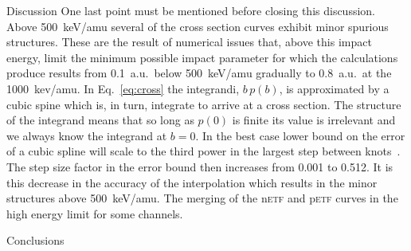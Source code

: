 \documentclass[aps, pra, reprint, groupedaddress, amsfonts,
               amsmath, amssymb, showpacs, nofootinbib]{revtex4-1}
\begin{document}
\begin{section}{Discussion \label{sec:disc}}
   One last point must be mentioned before closing this discussion. Above 500~keV/amu several of the cross
   section curves exhibit minor spurious structures. These are the result of numerical issues that, above
   this impact energy, limit the minimum possible impact parameter for which the calculations produce
   results from 0.1~a.u.\ below 500~keV/amu gradually to 0.8~a.u.\ at the 1000~kev/amu. In
   Eq.~\eqref{eq:cross} the integrandi, $b \, p(b)$, is approximated by a cubic spine which is, in turn,
   integrate to arrive at a cross section. The structure of the integrand means that so long as $p(0)$ is
   finite its value is irrelevant and we always know the integrand at $b = 0$. In the best case lower bound
   on the error of a cubic spline will scale to the third power in the largest step between
   knots~\cite{spline-err}. The step size factor in the error bound then increases from 0.001 to 0.512.
   It is this decrease in the accuracy of the interpolation which results in the minor structures above
   500~keV/amu. The merging of the n\textsc{etf} and p\textsc{etf} curves in the high energy limit for some
   channels.

\end{section}

\begin{section}{Conclusions \label{sec:conc}}
\end{section}


\end{document}
